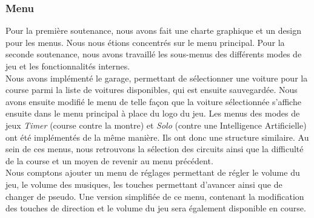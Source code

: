 \documentclass[a4paper,12pt]{article}
\newcommand{\AI}{Intelligence Artificielle}
\begin{document}
            \subsubsection{Menu}
                Pour la première soutenance, nous avons fait une charte graphique et un design pour les 
                menus.
                Nous nous étions concentrés sur le menu principal. Pour la seconde soutenance, nous 
                avons travaillé les sous-menus des différents modes de jeu et les fonctionnalités internes.\\
                Nous avons implémenté le garage, permettant de sélectionner une voiture pour la course parmi 
                la liste de voitures disponibles, qui est ensuite sauvegardée. 
                Nous avons ensuite modifié le menu de telle façon que la voiture sélectionnée s'affiche 
                ensuite dans le menu principal à place du logo du jeu. Les menus des modes de
                jeux \textsl{Timer} (course contre la montre) et \textsl{Solo} (contre une \AI) ont
                été implémentés de la même manière. Ils ont donc une structure similaire. Au sein de
                ces menus, nous retrouvons la sélection des circuits ainsi que la difficulté de la course et
                un moyen de revenir au menu précédent.\\
                Nous comptons ajouter un menu de réglages permettant de régler le volume du jeu, le volume
                des musiques, les touches permettant d'avancer ainsi que de changer de pseudo. Une 
                version simplifiée de ce menu, contenant la modification des touches de direction et le
                volume du jeu sera également disponible en course.
\end{document}
